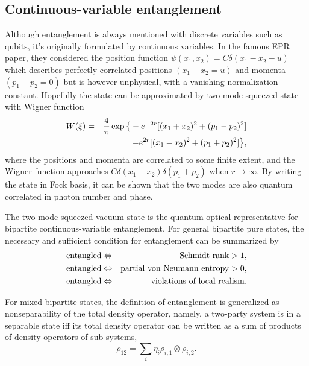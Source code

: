 \documentclass[%
 reprint,
groupedaddress,
showpacs,
 amsmath,amssymb,
 aps,
prb,
]{revtex4-1}
\begin{document}
	\subsection{Continuous-variable entanglement} %
	\label{sub:continuous_variable_entanglement}
		Although entanglement is always mentioned with discrete variables such as qubits, it's originally formulated by continuous variables. In the famous EPR paper,\cite{PhysRev.47.777} they considered the position function $ \psi(x_1,x_2) = C \delta(x_1-x_2-u) $ which describes perfectly correlated positions $(x_1-x_2=u)$ and momenta $ (p_1+p_2=0) $ but is however unphysical, with a vanishing normalization constant. Hopefully the state can be approximated by two-mode squeezed state with Wigner function
		\begin{eqnarray}
		W(\xi) &=& \frac{4}{\pi} \exp \big \{ -e^{-2r} [ (x_1+x_2)^2+(p_1-p_2)^2 ] \notag \\
		&& -e^{2r}[ (x_1-x_2)^2+(p_1+p_2)^2] \big \},
		\end{eqnarray}
		where the positions and momenta are correlated to some finite extent, and the Wigner function approaches $C \delta(x_1-x_2) \delta(p_1+p_2) $ when $r \rightarrow \infty $. By writing the state in Fock basis, it can be shown that the two modes are also quantum correlated in photon number and phase.\cite{Braunstein2005}

		The two-mode squeezed vacuum state is the quantum optical representative for bipartite continuous-variable entanglement. For general bipartite pure states, the necessary and sufficient condition for entanglement can be summarized by
		\begin{eqnarray}
			\text{entangled} &\Leftrightarrow& \text{Schmidt rank}>1, \notag\\
			\text{entangled} &\Leftrightarrow& \text{partial von Neumann entropy}>0, \notag \\
			\text{entangled} &\Leftrightarrow& \text{violations of local realism}. \notag
		\end{eqnarray}

		For mixed bipartite states, the definition of entanglement is generalized as nonseparability of the total density operator, namely, a two-party system is in a separable state iff its total density operator can be written as a sum of products of density operators of sub systems,
		\begin{equation}
		\label{eqn:two_mix_separable}
		\rho_{12} = \sum_i \eta_i \rho_{i,1}\otimes \rho_{i,2}.
		\end{equation}
		
\end{document}
